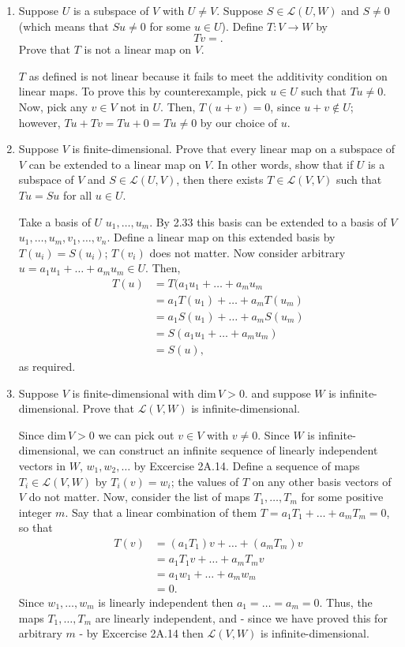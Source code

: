 \documentclass{book}
\begin{document}
\begin{enumerate}
\item Suppose \(U\) is a subspace of \(V\) with \(U \neq V\).  Suppose \(S \in \mathcal{L}(U,W)\) and \(S \neq 0\) (which means that \(Su \neq 0\) for some \(u \in U\)).  Define \(T: V \rightarrow W\) by \[Tv=.\]  Prove that \(T\) is not a linear map on \(V\).

\(T\) as defined is not linear because it fails to meet the additivity condition on linear maps.  To prove this by counterexample, pick \(u \in U\) such that \(Tu \neq 0\).  Now, pick any \(v \in V\) not in \(U\).  Then, \(T(u+v)=0\), since \(u+v \notin U\); however, \(Tu+Tv=Tu+0=Tu \neq 0\) by our choice of \(u\).

\item Suppose \(V\) is finite-dimensional.  Prove that every linear map on a subspace of \(V\) can be extended to a linear map on \(V\).  In other words, show that if \(U\) is a subspace of \(V\) and \(S \in \mathcal{L}(U,V)\), then there exists \(T \in \mathcal{L}(V,V)\) such that \(Tu=Su\) for all \(u \in U\).

Take a basis of \(U\) \(u_1,\dots,u_m\).  By 2.33 this basis can be extended to a basis of \(V\) \(u_1,\dots,u_m,v_1,\dots,v_n\).  Define a linear map on this extended basis by \(T(u_i)=S(u_i)\); \(T(v_i)\) does not matter.  Now consider arbitrary \(u = a_1u_1+\dots+a_mu_m \in U\).  Then, 
\begin{align*}
T(u) &= T(a_1u_1+\dots+a_mu_m \\
&= a_1T(u_1)+\dots+a_mT(u_m) \\
&= a_1S(u_1)+\dots+a_mS(u_m) \\
&= S(a_1u_1+\dots+a_mu_m) \\
&= S(u),
\end{align*}
as required.

\item Suppose \(V\) is finite-dimensional with \(\textrm{dim} \, V > 0\). and suppose \(W\) is infinite-dimensional.  Prove that \(\mathcal{L}(V,W)\) is infinite-dimensional.

Since \(\textrm{dim} \, V > 0\) we can pick out \(v \in V\) with \(v \neq 0\).  Since \(W\) is infinite-dimensional, we can construct an infinite sequence of linearly independent vectors in \(W\), \(w_1,w_2,\dots\) by Excercise 2A.14.  Define a sequence of maps \( T_i \in \mathcal{L}(V,W)\) by \(T_i(v)=w_i\); the values of \(T\) on any other basis vectors of \(V\) do not matter.  Now, consider the list of maps \(T_1,\dots,T_m\) for some positive integer \(m\).  Say that a linear combination of them \(T=a_1T_1+\dots+a_mT_m=0\), so that
\begin{align*}
T(v) &= (a_1T_1)v+\dots+(a_mT_m)v \\
&= a_1T_1v+\dots+a_mT_mv \\
&= a_1w_1+\dots+a_mw_m \\
&=0.
\end{align*}
Since \(w_1,\dots,w_m\) is linearly independent then \(a_1=\dots=a_m=0\).  Thus, the maps \(T_1,\dots,T_m\) are linearly independent, and - since we have proved this for arbitrary \(m\) - by Excercise 2A.14 then \(\mathcal{L}(V,W)\) is infinite-dimensional.


\end{enumerate}
\end{document}
